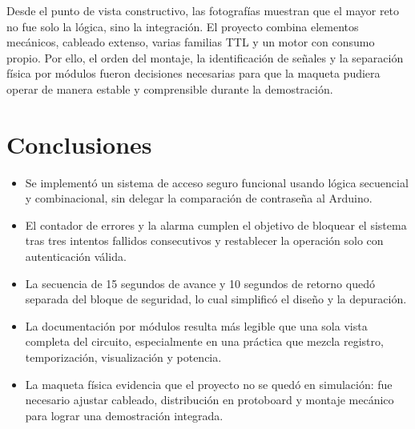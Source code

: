 \documentclass[12pt,a4paper]{article}
\begin{document}
Desde el punto de vista constructivo, las fotografías muestran que el mayor reto no fue solo la lógica, sino la integración. El proyecto combina elementos mecánicos, cableado extenso, varias familias TTL y un motor con consumo propio. Por ello, el orden del montaje, la identificación de señales y la separación física por módulos fueron decisiones necesarias para que la maqueta pudiera operar de manera estable y comprensible durante la demostración.

\section{Conclusiones}
\begin{itemize}[leftmargin=1.2cm]
    \item Se implementó un sistema de acceso seguro funcional usando lógica secuencial y combinacional, sin delegar la comparación de contraseña al Arduino.
    \item El contador de errores y la alarma cumplen el objetivo de bloquear el sistema tras tres intentos fallidos consecutivos y restablecer la operación solo con autenticación válida.
    \item La secuencia de 15 segundos de avance y 10 segundos de retorno quedó separada del bloque de seguridad, lo cual simplificó el diseño y la depuración.
    \item La documentación por módulos resulta más legible que una sola vista completa del circuito, especialmente en una práctica que mezcla registro, temporización, visualización y potencia.
    \item La maqueta física evidencia que el proyecto no se quedó en simulación: fue necesario ajustar cableado, distribución en protoboard y montaje mecánico para lograr una demostración integrada.
\end{itemize}
\end{document}
